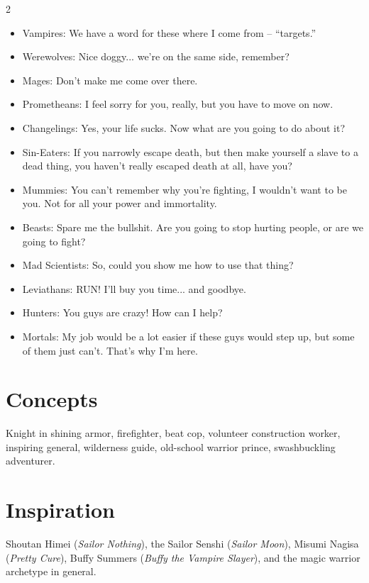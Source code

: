 \begin{multicols}{2}
\begin{itemize}
\item Vampires: We have a word for these where I come from -- “targets.”
\item Werewolves: Nice doggy... we're on the same side, remember?
\item Mages: Don't make me come over there.
\item Prometheans: I feel sorry for you, really, but you have to move on now.
\item Changelings: Yes, your life sucks. Now what are you going to do about it?
\item Sin-Eaters: If you narrowly escape death, but then make yourself a slave to a dead thing, you haven't really escaped death at all, have you?
\item Mummies: You can't remember why you're fighting, I wouldn't want to be you. Not for all your power and immortality.
\item Beasts: Spare me the bullshit. Are you going to stop hurting people, or are we going to fight?

\item Mad Scientists: So, could you show me how to use that thing?
\item Leviathans: RUN! I'll buy you time... and goodbye. 

\item Hunters: You guys are crazy! How can I help?
\item Mortals: My job would be a lot easier if these guys would step up, but some of them just can't. That's why I'm here. 
\end{itemize}

\section*{Concepts}

Knight in shining armor, firefighter, beat cop, volunteer construction worker, inspiring general, wilderness guide, old-school warrior prince, swashbuckling adventurer. 

\section*{Inspiration}
Shoutan Himei (\textit{Sailor Nothing}), the Sailor Senshi (\textit{Sailor Moon}), Misumi Nagisa (\textit{Pretty Cure}), Buffy Summers (\textit{Buffy the Vampire Slayer}), and the magic warrior archetype in general. 


\end{multicols}
